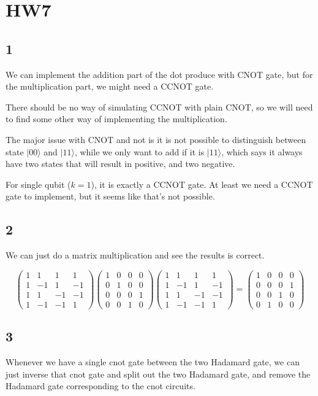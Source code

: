 \documentclass{article}%
\newcommand{\kt}[1]{|#1\rangle}
\begin{document}
\section*{HW7}

\subsection*{1}

We can implement the addition part of the dot produce with CNOT gate,
but for the multiplication part, we might need a CCNOT gate.

There should be no way of simulating CCNOT with plain CNOT,
so we will need to find some other way of implementing the multiplication.

The major issue with CNOT and not is it is not possible to distinguish between
state $\kt{00}$ and $\kt{11}$, while we only want to add if it is $\kt{11}$,
which says it always have two states that will result in positive, and two negative.

For single qubit ($k=1$), it is exactly a CCNOT gate.
At least we need a CCNOT gate to implement, but it seems like that's not possible.


\subsection*{2}

We can just do a matrix multiplication and see the results is correct.

\[
    \begin{pmatrix}
        1 & 1  & 1  & 1  \\
        1 & -1 & 1  & -1 \\
        1 & 1  & -1 & -1 \\
        1 & -1 & -1 & 1
    \end{pmatrix}
    \begin{pmatrix}
        1 & 0 & 0 & 0 \\
        0 & 1 & 0 & 0 \\
        0 & 0 & 0 & 1 \\
        0 & 0 & 1 & 0
    \end{pmatrix}
    \begin{pmatrix}
        1 & 1  & 1  & 1  \\
        1 & -1 & 1  & -1 \\
        1 & 1  & -1 & -1 \\
        1 & -1 & -1 & 1
    \end{pmatrix}
    =
    \begin{pmatrix}
        1 & 0 & 0 & 0 \\
        0 & 0 & 0 & 1 \\
        0 & 0 & 1 & 0 \\
        0 & 1 & 0 & 0
    \end{pmatrix}
\]

\subsection*{3}

Whenever we have a single cnot gate between the two Hadamard gate,
we can just inverse that cnot gate and split out the two Hadamard gate,
and remove the Hadamard gate corresponding to the cnot circuits.
\end{document}
